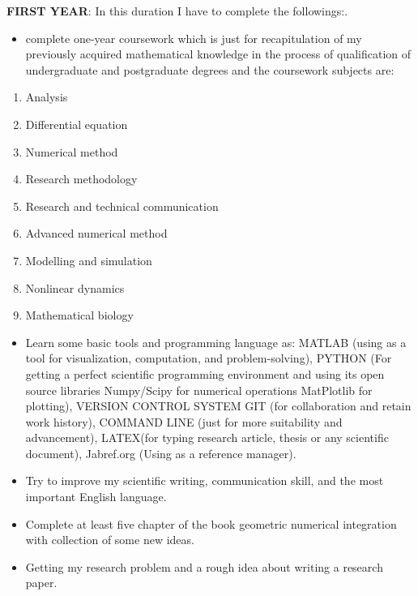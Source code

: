 \documentclass[PhD]{iitmdiss} %
\begin{document}
    {\textbf{FIRST YEAR}:{ In this duration I have to complete the followings:.}\\
    \begin{itemize}
    \item{complete one-year coursework  which is just for recapitulation of my previously acquired mathematical knowledge in the process of qualification of undergraduate and postgraduate degrees and the coursework subjects are:
}\\
\end{itemize}
\begin{enumerate}
    \item { Analysis}
    \item{ Differential equation}
    \item{ Numerical method}
    \item{ Research methodology}
    \item{ Research and technical communication}
    \item{ Advanced numerical method}
    \item{ Modelling and simulation}
    \item{ Nonlinear dynamics}
    \item{ Mathematical biology}
\end{enumerate}
\begin{itemize}
    \item {Learn some basic tools and programming language as: MATLAB (using as a tool for visualization, computation, and problem-solving), PYTHON (For getting a perfect scientific programming environment and using its open source libraries Numpy/Scipy for numerical operations MatPlotlib for plotting), VERSION CONTROL SYSTEM GIT (for collaboration and retain work history), COMMAND LINE (just for more suitability and advancement), LATEX(for typing research article, thesis or any scientific document), Jabref.org (Using as a reference manager).}\\
    
    \item{Try to improve my scientific writing, communication skill, and the most important English language.}\\
    \item{Complete at least five chapter of the book geometric numerical integration with collection of some new ideas.
}\\
\item{Getting my research problem and a rough idea about writing a research paper.}\\
\end{itemize}
\par

}
\end{document}
